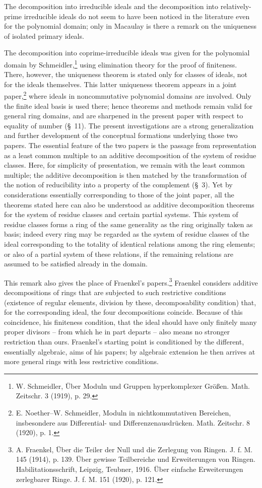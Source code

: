 \documentclass[11pt]{article}
\begin{document}
The decomposition into irreducible ideals and the decomposition into relatively-prime irreducible ideals do not seem to have been noticed in the literature even for the polynomial domain; only in Macaulay is there a remark on the uniqueness of isolated primary ideals.

The decomposition into coprime-irreducible ideals was given for the polynomial domain by Schmeidler,\footnote{W. Schmeidler, Über Moduln und Gruppen hyperkomplexer Größen. Math. Zeitschr. 3 (1919), p. 29.} using elimination theory for the proof of finiteness. There, however, the uniqueness theorem is stated only for classes of ideals, not for the ideals themselves. This latter uniqueness theorem appears in a joint paper,\footnote{E. Noether--W. Schmeidler, Moduln in nichtkommutativen Bereichen, insbesondere aus Differential- und Differenzenausdrücken. Math. Zeitschr. 8 (1920), p. 1.} where ideals in noncommutative polynomial domains are involved. Only the finite ideal basis is used there; hence theorems and methods remain valid for general ring domains, and are sharpened in the present paper with respect to equality of number (\S~11). The present investigations are a strong generalization and further development of the conceptual formations underlying those two papers. The essential feature of the two papers is the passage from representation as a least common multiple to an additive decomposition of the system of residue classes. Here, for simplicity of presentation, we remain with the least common multiple; the additive decomposition is then matched by the transformation of the notion of reducibility into a property of the complement (\S~3). Yet by considerations essentially corresponding to those of the joint paper, all the theorems stated here can also be understood as additive decomposition theorems for the system of residue classes and certain partial systems. This system of residue classes forms a ring of the same generality as the ring originally taken as basis; indeed every ring may be regarded as the system of residue classes of the ideal corresponding to the totality of identical relations among the ring elements; or also of a partial system of these relations, if the remaining relations are assumed to be satisfied already in the domain.

This remark also gives the place of Fraenkel's papers.\footnote{A. Fraenkel, Über die Teiler der Null und die Zerlegung von Ringen. J. f. M. 145 (1914), p. 139. Über gewisse Teilbereiche und Erweiterungen von Ringen. Habilitationsschrift, Leipzig, Teubner, 1916. Über einfache Erweiterungen zerlegbarer Ringe. J. f. M. 151 (1920), p. 121.} Fraenkel considers additive decompositions of rings that are subjected to such restrictive conditions (existence of regular elements, division by these, decomposability condition) that, for the corresponding ideal, the four decompositions coincide. Because of this coincidence, his finiteness condition, that the ideal should have only finitely many proper divisors -- from which he in part departs -- also means no stronger restriction than ours. Fraenkel's starting point is conditioned by the different, essentially algebraic, aims of his papers; by algebraic extension he then arrives at more general rings with less restrictive conditions.
\end{document}
